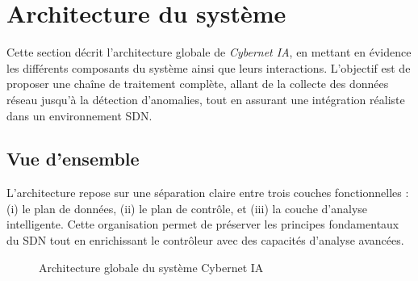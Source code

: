 \documentclass[11pt]{article}
\begin{document}
\section{Architecture du système}\label{sec:architecture}

Cette section décrit l’architecture globale de \textit{Cybernet IA}, en mettant en évidence les différents composants du système ainsi que leurs interactions. L’objectif est de proposer une chaîne de traitement complète, allant de la collecte des données réseau jusqu’à la détection d’anomalies, tout en assurant une intégration réaliste dans un environnement SDN.

\subsection{Vue d’ensemble}

L’architecture repose sur une séparation claire entre trois couches fonctionnelles : (i) le plan de données, (ii) le plan de contrôle, et (iii) la couche d’analyse intelligente. Cette organisation permet de préserver les principes fondamentaux du SDN tout en enrichissant le contrôleur avec des capacités d’analyse avancées.

\begin{figure}[h]
\centering
{}
\caption{Architecture globale du système Cybernet IA}
\end{figure}
\end{document}
